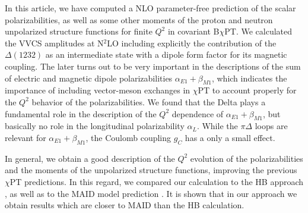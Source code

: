 \documentclass[12pt,preprint,tightenlines,
showpacs,preprintnumbers,amsmath,amssymb,
a4paper,nofootinbib]{revtex4-1}
\def\hpm{\hphantom{-}}
\begin{document}



In this article, we have computed a NLO parameter-free prediction of the scalar polarizabilities, as well as some other moments of the proton and neutron unpolarized structure functions for finite $Q^2$ in covariant B$\chi$PT. 
We calculated the VVCS amplitudes at N$^2$LO including explicitly the contribution of the $\Delta(1232)$ as an intermediate state with a dipole form factor for its magnetic coupling. The later turns out to be very important in the descriptions of the sum of electric and magnetic dipole polarizabilities $\alpha_{E1}+\beta_{M1}$, which indicates the importance of including vector-meson exchanges in $\chi$PT to account properly for the $Q^2$ behavior of the polarizabilities. We found that the Delta plays a fundamental role in the description of the $Q^2$ dependence of $\alpha_{E1}+\beta_{M1}$, but basically no role in the longitudinal polarizability $\alpha_L$. While the $\pi\Delta$ loops are relevant for $\alpha_{E1}+\beta_{M1}$, the Coulomb coupling $g_C$ has a only a small effect.

In general, we obtain a good description of the $Q^2$ evolution of the polarizabilities and the moments of the unpolarized structure functions, improving the previous $\chi$PT predictions.
In this regard, we compared our calculation to the HB approach \cite{Nevado:2007dd}, as well as to the MAID model prediction \cite{MAID}. 
It is shown that in our approach we obtain results which are closer to  MAID than the HB calculation.
\end{document}
